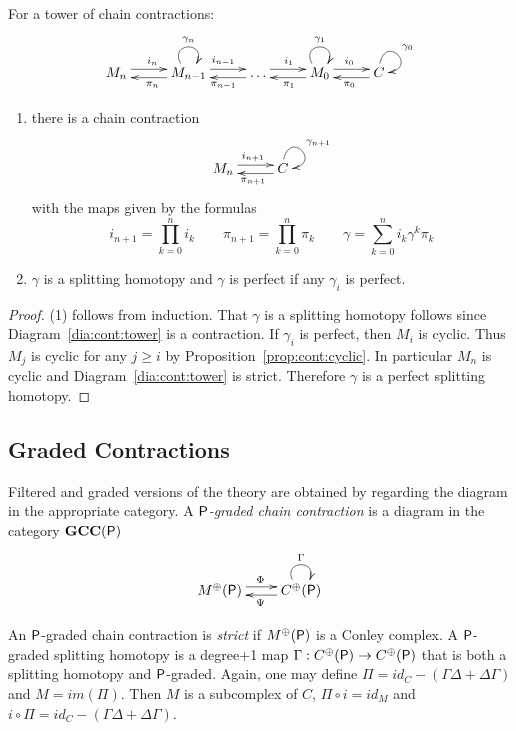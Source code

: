 \begin{prop}\label{prop:cont:tower}
For a tower of chain contractions:
\[
\xymatrixrowsep{0.03in}
\xymatrixcolsep{0.35in}
\xymatrix{
M_n \ar[r]<3pt>^{i_n} & \ar[l]<3pt>^{\pi_n } M_{n-1} \ar@(ul,ur)^{\gamma_n} \ar[r]<3pt>^{i_{n-1}} & \ar[l]<3pt>^{\pi_{n-1}}  \ldots \ar[r]<3pt>^{i_1}  & \ar[l]<3pt>^{\pi_1 }M_0 \ar@(ul,ur)^{\gamma_1}  \ar[r]<3pt>^{i_0} & \ar[l]<3pt>^{\pi_0} C \ar@(u,r)^{\gamma_0}
}
\]

\begin{enumerate}
\item there is a chain contraction 
\begin{align}\label{dia:cont:tower}
\xymatrixrowsep{0.03in}
\xymatrixcolsep{0.35in}
\xymatrix{
M_n \ar[r]<3pt>^{i_{n+1}} & \ar[l]<3pt>^{\pi_{n+1}} C \ar@(u,r)^{\gamma_{n+1} }
}
\end{align}
with the maps given by the formulas
\[
i_{n+1} = \prod_{k=0}^n i_k \quad\quad \pi_{n+1} = \prod_{k=0}^n \pi_k \quad\quad \gamma = \sum_{k=0}^n i_k \gamma^k \pi_k
\]
\item $\gamma$ is a splitting homotopy and $\gamma$ is perfect if any $\gamma_i$ is perfect.

\end{enumerate}
\end{prop}
\begin{proof}
(1) follows from induction.  That $\gamma$ is a splitting homotopy follows since Diagram~\ref{dia:cont:tower} is a contraction.  If $\gamma_i$ is perfect, then $M_i$ is cyclic.  Thus $M_j$ is cyclic for any $j\geq i$ by Proposition~\ref{prop:cont:cyclic}. In particular $M_n$ is cyclic and Diagram~\ref{dia:cont:tower} is strict.  Therefore $\gamma$ is a perfect splitting homotopy.
\end{proof}






\subsection{Graded Contractions}

Filtered and graded versions of the theory are obtained by regarding the diagram in the appropriate category.  A {\em ${\mathsf P}$-graded chain contraction} is a diagram in the category ${\bf GCC({\mathsf P})}$
 \[
\xymatrixrowsep{0.03in}
\xymatrixcolsep{0.3in}
\xymatrix{
M^\oplus(\sP)  \ar[r]<3pt>^{\Phi} & \ar[l]<3pt>^{\Psi} C^\oplus(\sP)\ar@(ul,ur)^{\Gamma}
}
\]

 An ${\mathsf P}$-graded chain contraction is {\em strict} if $M^\oplus({\mathsf P})$ is a Conley complex.  A ${\mathsf P}$-graded splitting homotopy is a degree+1 map $\Gamma:C^\oplus({\mathsf P})\to C^\oplus({\mathsf P})$ that is both a splitting homotopy and ${\mathsf P}$-graded.    Again, one may define $\Pi=id_C-(\Gamma\Delta+\Delta\Gamma)$ and $M=im(\Pi)$.  Then $M$ is a subcomplex of $C$, $\Pi \circ i = id_M$ and $i\circ \Pi = id_C-(\Gamma\Delta+\Delta\Gamma)$.  
  
